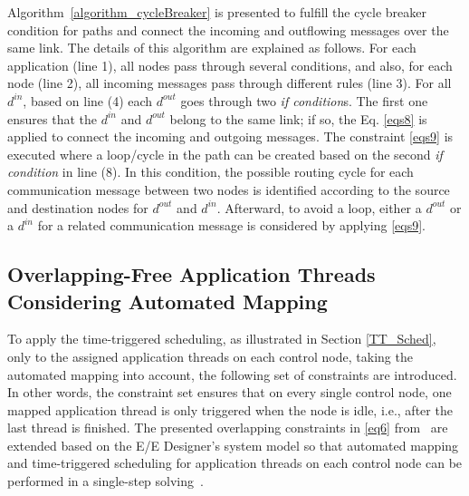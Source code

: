         
     Algorithm~\ref{algorithm_cycleBreaker} is presented to fulfill the cycle breaker condition for paths and connect the incoming and outflowing messages over the same link. The details of this algorithm are explained as follows. For each application (line 1), all nodes pass through several conditions, and also, for each node (line 2), all incoming messages pass through different rules (line 3). For all $d^{in}$, based on line (4) each $d^{out}$ goes through two \textit{if condition}s. The first one ensures that the $d^{in}$ and $d^{out}$ belong to the same link; if so, the Eq. \eqref{eqs8} is applied to connect the incoming and outgoing messages. The constraint \eqref{eqs9} is executed where a loop/cycle in the path can be created based on the second \textit{if condition} in line (8). In this condition, the possible routing cycle for each communication message between two nodes is identified according to the source and destination nodes for $d^{out}$ and $d^{in}$. Afterward, to avoid a loop, either a $d^{out}$ or a $d^{in}$ for a related communication message is considered by applying \eqref{eqs9}. 
     
       
       
   

        

    \subsection{Overlapping-Free Application Threads Considering Automated Mapping }\label{overlapping1}
    
    To apply the time-triggered scheduling, as illustrated in Section \ref{TT_Sched}, only to the assigned application threads on each control node, taking the automated mapping into account, the following set of constraints are introduced. In other words, the constraint set ensures that on every single control node, one mapped application thread is only triggered when the node is idle, i.e., after the last thread is finished. The presented overlapping constraints in \eqref{eq6} from~\cite{zhang2014task} are extended based on the E/E Designer's system model so that automated mapping and time-triggered scheduling for application threads on each control node can be performed in a single-step solving~\cite{askaripoor2023designer}. 
    
